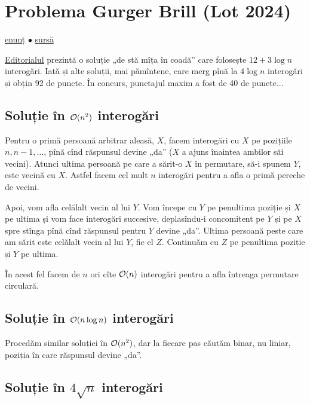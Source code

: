 \documentclass[../main.tex]{subfiles}
\begin{document}
\section{Problema Gurger Brill (Lot 2024)}
\label{problem:gurger-brill}

\href{https://kilonova.ro/problems/2831}{enunț}
$\bullet$
\hyperref[code:gurger-brill]{sursă}

\href{https://github.com/roalgo-discord/Romanian-Olympiad-Solutions/blob/main/Baraj\%20\%2B\%20Lot\%20Seniori\%20(IOI\%20team\%20selection\%20tests)/2024/Lot\%203\%20Seniori\%202024.pdf}{Editorialul} prezintă o soluție „de stă mîța în coadă” care folosește $12 + 3 \log n$ interogări. Iată și alte soluții, mai pămîntene, care merg pînă la $4 \log n$ interogări și obțin 92 de puncte. În concurs, punctajul maxim a fost de 40 de puncte...

\subsection{Soluție în \texorpdfstring{$\mathcal{O}(n^2)$}{O(n2)} interogări}

Pentru o primă persoană arbitrar aleasă, $X$, facem interogări cu $X$ pe pozițiile $n, n-1, \dots$, pînă cînd răspunsul devine „da” ($X$ a ajuns înaintea ambilor săi vecini). Atunci ultima persoană pe care a sărit-o $X$ în permutare, să-i spunem $Y$, este vecină cu $X$. Astfel facem cel mult $n$ interogări pentru a afla o primă pereche de vecini.

Apoi, vom afla celălalt vecin al lui $Y$. Vom începe cu $Y$ pe penultima poziție și $X$ pe ultima și vom face interogări succesive, deplasîndu-i concomitent pe $Y$ și pe $X$ spre stînga pînă cînd răspunsul pentru $Y$ devine „da”. Ultima persoană peste care am sărit este celălalt vecin al lui $Y$, fie el $Z$. Continuăm cu $Z$ pe penultima poziție și $Y$ pe ultima.

În acest fel facem de $n$ ori cîte $\mathcal{O}(n)$ interogări pentru a afla întreaga permutare circulară.

\subsection{Soluție în \texorpdfstring{$\mathcal{O}(n \log n)$}{O(n log n)} interogări}

Procedăm similar soluției în $\mathcal{O}(n^2)$, dar la fiecare pas căutăm binar, nu liniar, poziția în care răspunsul devine „da”.

\subsection{Soluție în \texorpdfstring{$4 \sqrt{n}$}{4 sqrt(n)} interogări}
\end{document}
